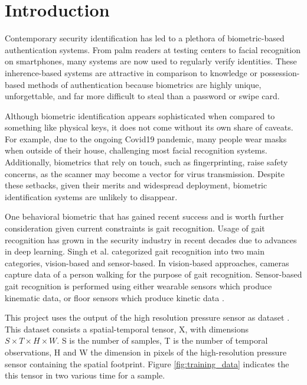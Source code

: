 \section{Introduction}

Contemporary security identification has led to a plethora of biometric-based authentication systems. From palm readers at testing centers to facial recognition on smartphones, many systems are now used to regularly verify identities. These inherence-based systems are attractive in comparison to knowledge or possession-based methods of authentication because biometrics are highly unique, unforgettable, and far more difficult to steal than a password or swipe card.

Although biometric identification appears sophisticated when compared to something like physical keys, it does not come without its own share of caveats. For example, due to the ongoing Covid19 pandemic, many people wear masks when outside of their house, challenging most facial recognition systems. Additionally, biometrics that rely on touch, such as fingerprinting, raise safety concerns, as the scanner may become a vector for virus transmission. Despite these setbacks, given their merits and widespread deployment, biometric identification systems are unlikely to disappear.

One behavioral biometric that has gained recent success and is worth further consideration given current constraints is gait recognition. Usage of gait recognition has grown in the security industry in recent decades due to advances in deep learning. Singh et al. \cite{Singh2019APerspectives} categorized gait recognition into two main categories, vision-based and sensor-based. In vision-based approaches, cameras capture data of a person walking for the purpose of gait recognition. Sensor-based gait recognition is performed using either wearable sensors which produce kinematic data, or floor sensors which produce kinetic data \cite{Connor2018BiometricFeatures}.




This project uses the output of the high resolution pressure sensor as dataset \cite{Connor2015ComparingBiometrics}. This dataset consists a spatial-temporal tensor, X, with dimensions $S × T × H × W$. S is the number of samples, T is the number of temporal observations, H and W the dimension in pixels of the high-resolution pressure sensor containing the spatial footprint. Figure \ref{fig:training_data} indicates the this tensor in two various time for a sample.

